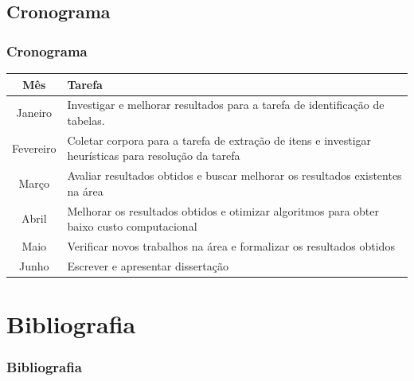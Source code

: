 \documentclass{beamer}
\begin{document}
\begin{frame}
  \subsection{Cronograma}
  \frametitle{Cronograma}
  \begin{center}
  {\small
  \begin{tabular}{| c | p{8cm} |}
    \hline
    Mês & Tarefa \\ \hline

    Janeiro & Investigar e melhorar resultados para a tarefa de identificação de tabelas. \\ \hline

    Fevereiro & Coletar corpora para a tarefa de extração de itens e investigar heurísticas para resolução da tarefa \\ \hline

    Março & Avaliar resultados obtidos e buscar melhorar os resultados existentes na área \\ \hline

    Abril &  Melhorar os resultados obtidos e otimizar algoritmos para obter baixo custo computacional \\ \hline

    Maio & Verificar novos trabalhos na área e formalizar os resultados obtidos \\ \hline

    Junho & Escrever e apresentar dissertação \\ \hline

  \end{tabular}
}
  \end{center}

\end{frame}




\section{Bibliografia}
\begin{frame}[allowframebreaks]
  \frametitle{Bibliografia}
   
  
\end{frame}
\end{document}
